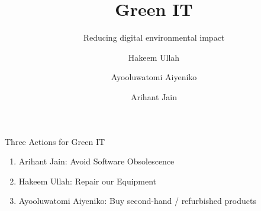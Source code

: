 \documentclass[aspectratio=169]{beamer}
\title{Green IT}
\subtitle{Reducing digital environmental impact}
\author{Hakeem Ullah \and Ayooluwatomi Aiyeniko \and Arihant Jain}
\institute{EPITA -- Master in Computer Science\\Software Engineering -- Fall 2025}
\date{}
\begin{document}
\begin{frame}
  \titlepage
\end{frame}

\begin{frame}{Three Actions for Green IT}
\Large
\begin{enumerate}
  \vspace{0.3cm}
  \item Arihant Jain: Avoid Software Obsolescence
  \vspace{0.3cm}
  \item Hakeem Ullah: Repair our Equipment
  \vspace{0.3cm}
  \item Ayooluwatomi Aiyeniko: Buy second-hand / refurbished products
\end{enumerate}
\end{frame}

\end{document}
